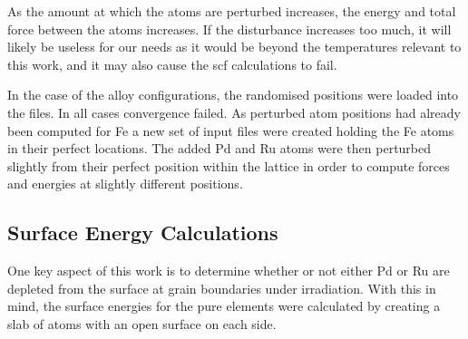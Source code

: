 As the amount at which the atoms are perturbed increases, the energy and total force between the atoms increases.  If the disturbance increases too much, it will likely be useless for our needs as it would be beyond the temperatures relevant to this work, and it may also cause the \acrshort{scf} calculations to fail.

In the case of the alloy configurations, the randomised positions were loaded into the files.  In all cases convergence failed.  As perturbed atom positions had already been computed for Fe a new set of input files were created holding the Fe atoms in their perfect locations.  The added Pd and Ru atoms were then perturbed slightly from their perfect position within the lattice in order to compute forces and energies at slightly different positions.


\FloatBarrier
\subsection{Surface Energy Calculations}

One key aspect of this work is to determine whether or not either Pd or Ru are depleted from the surface at grain boundaries under irradiation.  With this in mind, the surface energies for the pure elements were calculated by creating a slab of atoms with an open surface on each side.

